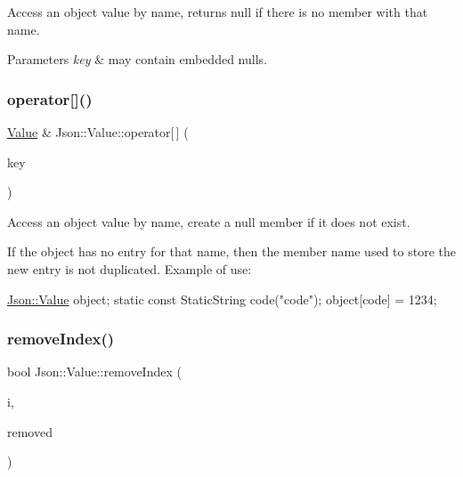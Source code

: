 Access an object value by name, returns null if there is no member with that name. 
\begin{DoxyParams}{Parameters}
{\em key} & may contain embedded nulls. \\
\hline
\end{DoxyParams}
\mbox{\label{class_json_1_1_value_ac3763d7d315ca65dc188e273722f7955}} 
\subsubsection{\texorpdfstring{operator[]()}{operator[]()}\hspace{0.1cm}{\footnotesize\ttfamily [9/9]}}
{\footnotesize\ttfamily \hyperlink{class_json_1_1_value}{Value} \& Json\+::\+Value\+::operator\mbox{[}$\,$\mbox{]} (\begin{DoxyParamCaption}\item[{const \hyperlink{class_json_1_1_static_string}{Static\+String} \&}]{key }\end{DoxyParamCaption})}



Access an object value by name, create a null member if it does not exist. 

If the object has no entry for that name, then the member name used to store the new entry is not duplicated. Example of use\+: 
\begin{DoxyCode}
\hyperlink{class_json_1_1_value}{Json::Value} object;
\textcolor{keyword}{static} \textcolor{keyword}{const} StaticString code(\textcolor{stringliteral}{"code"});
\textcolor{keywordtype}{object}[code] = 1234;
\end{DoxyCode}
 \mbox{\label{class_json_1_1_value_ae9e67e08a85a2f3be3396ec0f4c47f65}} 
\subsubsection{\texorpdfstring{remove\+Index()}{removeIndex()}}
{\footnotesize\ttfamily bool Json\+::\+Value\+::remove\+Index (\begin{DoxyParamCaption}\item[{Array\+Index}]{i,  }\item[{\hyperlink{class_json_1_1_value}{Value} $\ast$}]{removed }\end{DoxyParamCaption})}



